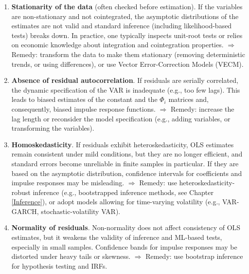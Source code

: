 \documentclass[
  11pt,
]{book}
\theoremstyle{definition}
\theoremstyle{definition}
\theoremstyle{definition}
\theoremstyle{definition}
\theoremstyle{remark}
\begin{document}
\begin{enumerate}
\def\labelenumi{\arabic{enumi}.}
\item
  \textbf{Stationarity of the data} (often checked before estimation). If the variables are non-stationary and not cointegrated, the asymptotic distributions of the estimates are not valid and standard inference (including likelihood-based tests) breaks down. In practice, one typically inspects unit-root tests or relies on economic knowledge about integration and cointegration properties. \(\Rightarrow\) Remedy: transform the data to make them stationary (removing deterministic trends, or using differences), or use Vector Error-Correction Models (VECM).
\item
  \textbf{Absence of residual autocorrelation}. If residuals are serially correlated, the dynamic specification of the VAR is inadequate (e.g., too few lags). This leads to biased estimates of the constant and the \(\Phi_i\) matrices and, consequently, biased impulse response functions. \(\Rightarrow\) Remedy: increase the lag length or reconsider the model specification (e.g., adding variables, or transforming the variables).
\item
  \textbf{Homoskedasticity}. If residuals exhibit heteroskedasticity, OLS estimates remain consistent under mild conditions, but they are no longer efficient, and standard errors become unreliable in finite samples in particular. If they are based on the asymptotic distribution, confidence intervals for coefficients and impulse responses may be misleading. \(\Rightarrow\) Remedy: use heteroskedasticity-robust inference (e.g., bootstrapped inference methods, see Chapter \ref{Inference}), or adopt models allowing for time-varying volatility (e.g., VAR-GARCH, stochastic-volatility VAR).
\item
  \textbf{Normality of residuals}. Non-normality does not affect consistency of OLS estimates, but it weakens the validity of inference and ML-based tests, especially in small samples. Confidence bands for impulse responses may be distorted under heavy tails or skewness. \(\Rightarrow\) Remedy: use bootstrap inference for hypothesis testing and IRFs.
\end{enumerate}
\end{document}

